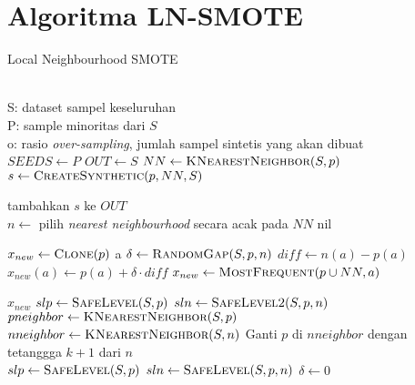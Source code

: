 \label{lampiran:alg_lnsmote}
\chapter{Algoritma LN-SMOTE}


\begin{algorithm}[htbp]
\caption{Local Neighbourhood SMOTE}
\label{alg:lnsmote}
\begin{multicols}{2}
\begin{algorithmic}[1]
\Require \\
S: dataset sampel keseluruhan \\
P: sample minoritas dari $ S $ \\
o: rasio \textit{over-sampling}, jumlah sampel sintetis yang akan dibuat \\

	\State $ SEEDS \gets P $
	\State $ OUT \gets S $
		\State $ NN \gets \Call{KNearestNeighbor}{S, p} $
			\State $ s \gets \Call{CreateSynthetic}{p, NN, S} $

				\State tambahkan $ s $ ke $OUT$
			\EndIf
		\EndFor
	\EndFor
	\State {}
\EndFunction
\\
	\State $ n \gets $ pilih \textit{nearest neighbourhood} secara acak
	pada $ NN $
		\State \Return nil
	\EndIf

	\State $ x_{new} \gets \Call{Clone}{p} $
	a
			\State $ \delta \gets \Call{RandomGap}{S, p, n} $
			\State $ diff \gets n(a) - p(a) $
			\State $ x_{new}(a) \gets p(a) + \delta \cdot diff $
		\Else
			\State $ x_{new} \gets \Call{MostFrequent}{p \cup NN, a} $
		\EndIf
	\EndFor

	\State \Return $ x_{new} $
\EndFunction
\columnbreak
{}
	\State $ slp \gets \Call{SafeLevel}{S, p} $
	\State $ sln \gets \Call{SafeLevel2}{S, p, n} $
	\State {}
\EndFunction
\\
	\State $ pneighbor \gets \Call{KNearestNeighbor}{S, p} $
	\State {}
\EndFunction
\\
	\State $ nneighbor \gets \Call{KNearestNeighbor}{ S, n } $
		\State Ganti $ p $ di $ nneighbor $ dengan tetanggga $ k + 1 $
		dari $ n $
	\EndIf
	\State {}
\EndFunction
\\
	\State $ slp \gets \Call{SafeLevel}{S, p} $
	\State $ sln \gets \Call{SafeLevel}{S, p, n} $
	\State $ \delta \gets 0 $


\end{algorithmic}
\end{multicols}
\end{algorithm}
